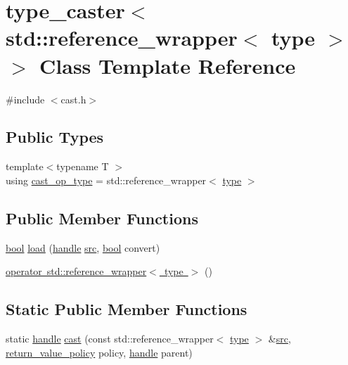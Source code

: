 \hypertarget{classtype__caster_3_01std_1_1reference__wrapper_3_01type_01_4_01_4}{}\section{type\+\_\+caster$<$ std\+::reference\+\_\+wrapper$<$ type $>$ $>$ Class Template Reference}
\label{classtype__caster_3_01std_1_1reference__wrapper_3_01type_01_4_01_4}


{\ttfamily \#include $<$cast.\+h$>$}

\subsection*{Public Types}
\begin{DoxyCompactItemize}
\item 
{\footnotesize template$<$typename T $>$ }\\using \mbox{\hyperlink{classtype__caster_3_01std_1_1reference__wrapper_3_01type_01_4_01_4_a6685ce2cf35603c77c4830453c900be5}{cast\+\_\+op\+\_\+type}} = std\+::reference\+\_\+wrapper$<$ \mbox{\hyperlink{_s_d_l__opengl_8h_ad5ddf6fca7b585646515660e810e0188}{type}} $>$
\end{DoxyCompactItemize}
\subsection*{Public Member Functions}
\begin{DoxyCompactItemize}
\item 
\mbox{\hyperlink{asdl_8h_af6a258d8f3ee5206d682d799316314b1}{bool}} \mbox{\hyperlink{classtype__caster_3_01std_1_1reference__wrapper_3_01type_01_4_01_4_ae3db464b00bc218012b7a111b90fd1c2}{load}} (\mbox{\hyperlink{classhandle}{handle}} \mbox{\hyperlink{_s_d_l__opengl__glext_8h_a72e0fdf0f845ded60b1fada9e9195cd7}{src}}, \mbox{\hyperlink{asdl_8h_af6a258d8f3ee5206d682d799316314b1}{bool}} convert)
\item 
\mbox{\hyperlink{classtype__caster_3_01std_1_1reference__wrapper_3_01type_01_4_01_4_a47a6b670b773eac43a50bb678ae41839}{operator std\+::reference\+\_\+wrapper$<$ type $>$}} ()
\end{DoxyCompactItemize}
\subsection*{Static Public Member Functions}
\begin{DoxyCompactItemize}
\item 
static \mbox{\hyperlink{classhandle}{handle}} \mbox{\hyperlink{classtype__caster_3_01std_1_1reference__wrapper_3_01type_01_4_01_4_a345e25ad868cc4b8659dbe1c7f3b1153}{cast}} (const std\+::reference\+\_\+wrapper$<$ \mbox{\hyperlink{_s_d_l__opengl_8h_ad5ddf6fca7b585646515660e810e0188}{type}} $>$ \&\mbox{\hyperlink{_s_d_l__opengl__glext_8h_a72e0fdf0f845ded60b1fada9e9195cd7}{src}}, \mbox{\hyperlink{detail_2common_8h_adde72ab1fb0dd4b48a5232c349a53841}{return\+\_\+value\+\_\+policy}} policy, \mbox{\hyperlink{classhandle}{handle}} parent)
\end{DoxyCompactItemize}
